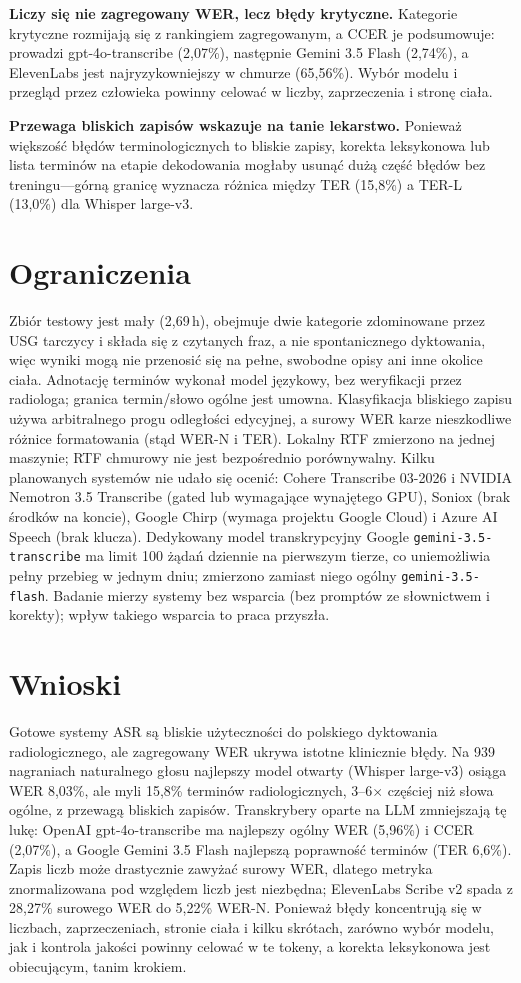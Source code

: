 \documentclass[conference]{IEEEtran}
\begin{document}
\noindent\textbf{Liczy się nie zagregowany WER, lecz błędy krytyczne.} Kategorie krytyczne rozmijają się z rankingiem zagregowanym, a CCER je podsumowuje: prowadzi gpt-4o-transcribe (2,07\%), następnie Gemini 3.5 Flash (2,74\%), a ElevenLabs jest najryzykowniejszy w chmurze (65,56\%). Wybór modelu i przegląd przez człowieka powinny celować w liczby, zaprzeczenia i stronę ciała.

\noindent\textbf{Przewaga bliskich zapisów wskazuje na tanie lekarstwo.} Ponieważ większość błędów terminologicznych to bliskie zapisy, korekta leksykonowa lub lista terminów na etapie dekodowania mogłaby usunąć dużą część błędów bez treningu---górną granicę wyznacza różnica między TER (15,8\%) a TER-L (13,0\%) dla Whisper large-v3.

\section{Ograniczenia}
Zbiór testowy jest mały (2,69\,h), obejmuje dwie kategorie zdominowane przez USG tarczycy i składa się z czytanych fraz, a nie spontanicznego dyktowania, więc wyniki mogą nie przenosić się na pełne, swobodne opisy ani inne okolice ciała. Adnotację terminów wykonał model językowy, bez weryfikacji przez radiologa; granica termin/słowo ogólne jest umowna. Klasyfikacja bliskiego zapisu używa arbitralnego progu odległości edycyjnej, a surowy WER karze nieszkodliwe różnice formatowania (stąd WER-N i TER). Lokalny RTF zmierzono na jednej maszynie; RTF chmurowy nie jest bezpośrednio porównywalny. Kilku planowanych systemów nie udało się ocenić: Cohere Transcribe 03-2026 i NVIDIA Nemotron 3.5 Transcribe (gated lub wymagające wynajętego GPU), Soniox (brak środków na koncie), Google Chirp (wymaga projektu Google Cloud) i Azure AI Speech (brak klucza). Dedykowany model transkrypcyjny Google \texttt{gemini-3.5-transcribe} ma limit 100 żądań dziennie na pierwszym tierze, co uniemożliwia pełny przebieg w jednym dniu; zmierzono zamiast niego ogólny \texttt{gemini-3.5-flash}. Badanie mierzy systemy bez wsparcia (bez promptów ze słownictwem i korekty); wpływ takiego wsparcia to praca przyszła.

\section{Wnioski}
Gotowe systemy ASR są bliskie użyteczności do polskiego dyktowania radiologicznego, ale zagregowany WER ukrywa istotne klinicznie błędy. Na 939 nagraniach naturalnego głosu najlepszy model otwarty (Whisper large-v3) osiąga WER 8,03\%, ale myli 15,8\% terminów radiologicznych, 3--6$\times$ częściej niż słowa ogólne, z przewagą bliskich zapisów. Transkrybery oparte na LLM zmniejszają tę lukę: OpenAI gpt-4o-transcribe ma najlepszy ogólny WER (5,96\%) i CCER (2,07\%), a Google Gemini 3.5 Flash najlepszą poprawność terminów (TER 6,6\%). Zapis liczb może drastycznie zawyżać surowy WER, dlatego metryka znormalizowana pod względem liczb jest niezbędna; ElevenLabs Scribe v2 spada z 28,27\% surowego WER do 5,22\% WER-N. Ponieważ błędy koncentrują się w liczbach, zaprzeczeniach, stronie ciała i kilku skrótach, zarówno wybór modelu, jak i kontrola jakości powinny celować w te tokeny, a korekta leksykonowa jest obiecującym, tanim krokiem.
\end{document}
